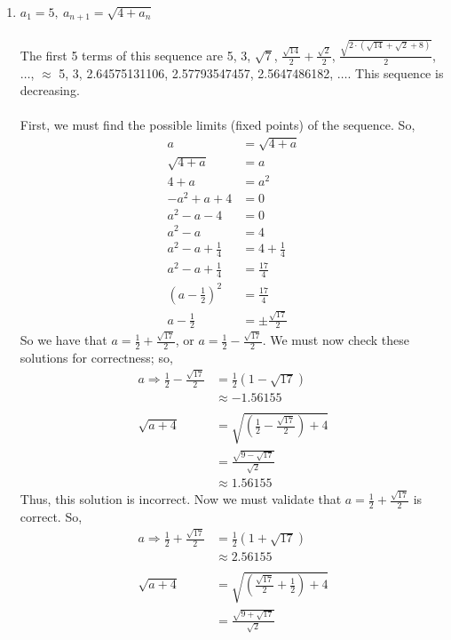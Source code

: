 \documentclass[12pt,letterpaper]{article}
\theoremstyle{case}
\theoremstyle{definition}
\begin{document}
\begin{enumerate}
\begin{enumerate}
		\item $a_1 = 5,\ a_{n+1}=\sqrt{4+a_n}$
		\\\\The first 5 terms of this sequence are 5, 3, $\sqrt{7}$, $ \frac{\sqrt{14}}{2} + \frac{\sqrt{2}}{2} $, $ \frac{\sqrt{2 \cdot (\sqrt{14}+\sqrt{2}+8)}}{2} $, $\dots$, $\approx$ 5, 3, 2.64575131106, 2.57793547457, 2.5647486182, $\dots$. This sequence is decreasing.
		\\\\First, we must find the possible limits (fixed points) of the sequence. So,
		\begin{align*}
			a&=\sqrt{4+a} \\
			\sqrt{4+a} &= a \\
			4+a &= a^2 \\
			-a^2+a+4 &= 0 \\
			a^2-a-4 &= 0 \\
			a^2-a&=4 \\
			a^2-a+\frac{1}{4}&=4+\frac{1}{4} \\
			a^2-a+\frac{1}{4}&=\frac{17}{4} \\
			(a-\frac{1}{2})^2&=\frac{17}{4} \\
			a-\frac{1}{2}&=\pm \frac{\sqrt{17}}{2}
		\end{align*}
		So we have that $a=\frac{1}{2} + \frac{\sqrt{17}}{2}$, or $a=\frac{1}{2}-\frac{\sqrt{17}}{2}$. We must now check these solutions for correctness; so, 
		\begin{align*}
			a \Rightarrow \frac{1}{2}-\frac{\sqrt{17}}{2} &=\frac{1}{2} \left(1-\sqrt{17}\right) \\
			&\approx -1.56155 \\\\
			\sqrt{a+4} &= \sqrt{\left(\frac{1}{2}-\frac{\sqrt{17}}{2}\right)+4} \\
			&=\frac{\sqrt{9-\sqrt{17}}}{\sqrt{2}} \\
			&\approx 1.56155
		\end{align*}
		Thus, this solution is incorrect. Now we must validate that $a=\frac{1}{2}+\frac{\sqrt{17}}{2}$ is correct. So,
		\begin{align*}
			a \Rightarrow \frac{1}{2}+\frac{\sqrt{17}}{2} &= \frac{1}{2}\left(1+\sqrt{17}\right) \\
			&\approx 2.56155 \\\\
			\sqrt{a+4} &= \sqrt{\left(\frac{\sqrt{17}}{2}+\frac{1}{2}\right)+4} \\
			&= \frac{\sqrt{9+\sqrt{17}}}{\sqrt{2}} \\

\end{align*}
\end{enumerate}
\end{enumerate}
\end{document}
